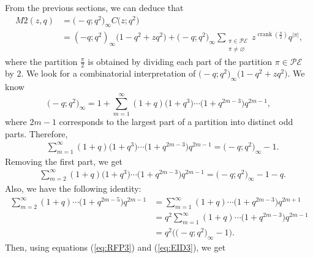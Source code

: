 \documentclass[10pt,a4paper]{amsart}
\numberwithin{equation}{section}
\newcommand\mylabel[1]{\label{#1}}
\newcommand\eqn[1]{(\ref{eq:#1})}
\begin{document}
From the previous sections, we can deduce that
\begin{align*}
M2(z,q)&=\bigl(-q;q^2\bigr)_{\infty} C\bigl(z;q^2\bigr)
\\
&=(-q;q^2)_{\infty} \bigl(1-q^2+zq^2\bigr)+\bigl(-q;q^2\bigr)_{\infty} \sum\limits_{\substack{{\pi \in \mathcal{PE}}\\ \pi \neq \varnothing}}z^{\operatorname{crank}(\frac{\pi}{2})}q^{|\pi|},
\end{align*}
where the partition $\frac{\pi}{2}$ is obtained by dividing each part of the partition $\pi \in \mathcal{PE}$ by $2$. We look for a combinatorial interpretation of $\bigl(-q;q^2\bigr)_{\infty}\bigl(1-q^2+zq^2\bigr)$. We know
\begin{equation*}%
\bigl(-q;q^2\bigr)_{\infty}=1+\sum\limits_{m=1}^{\infty}(1+q)\bigl(1+q^3\bigr)\cdots\bigl(1+q^{2m-3}\bigr)q^{2m-1},
\end{equation*}
where $2m-1$ corresponds to the largest part of a partition into distinct odd parts. Therefore,
\begin{align*}
&\sum\limits_{m=1}^{\infty}(1+q)\bigl(1+q^3\bigr)\cdots\bigl(1+q^{2m-3}\bigr)q^{2m-1}=\bigl(-q;q^2\bigr)_{\infty}-1.
\end{align*}
Removing the first part, we get
\begin{align}
\mylabel{eq:RFP3}
&\sum\limits_{m=2}^{\infty}(1+q)\bigl(1+q^3\bigr)\cdots\bigl(1+q^{2m-3}\bigr)q^{2m-1}=\bigl(-q;q^2\bigr)_{\infty}-1-q.
\end{align}
Also, we have the following identity:
\begin{align}
\nonumber
\sum\limits_{m=2}^{\infty}(1+q)\cdots\bigl(1+q^{2m-5}\bigr)q^{2m-1}&=\sum\limits_{m=1}^{\infty}(1+q)\cdots\bigl(1+q^{2m-3}\bigr)q^{2m+1}
\\
\nonumber
&=q^2\sum\limits_{m=1}^{\infty}(1+q)\cdots\bigl(1+q^{2m-3}\bigr)q^{2m-1}
\\
\mylabel{eq:EID3}
&=q^2\bigl(\bigl(-q;q^2\bigr)_{\infty}-1\bigr).
\end{align}
Then, using equations \eqn{RFP3} and \eqn{EID3}, we get
\end{document}

